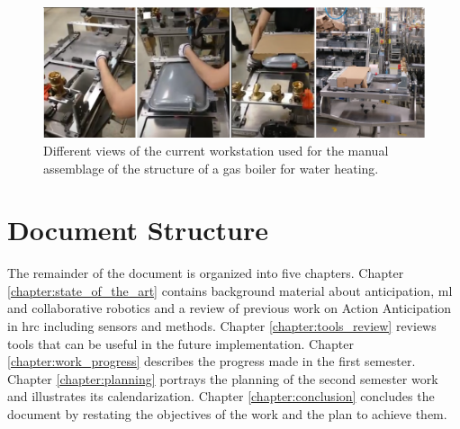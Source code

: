 \begin{figure}[H]
\centerline{\includegraphics[width=6in]{figs/usecase.png}}
\caption{Different views of the current workstation used for the manual assemblage of the structure of a gas boiler for water heating.}
\label{fig:usecase}
\end{figure}

\section{Document Structure}

The remainder of the document is organized into five chapters. Chapter \ref{chapter:state_of_the_art} contains background material about anticipation, \acl{ml} and collaborative robotics and a review of previous work on Action Anticipation in \acs{hrc} including sensors and methods. Chapter \ref{chapter:tools_review} reviews tools that can be useful in the future implementation. Chapter \ref{chapter:work_progress} describes the progress made in the first semester. Chapter \ref{chapter:planning} portrays the planning of the second semester work and illustrates its calendarization. Chapter \ref{chapter:conclusion} concludes the document by restating the objectives of the work and the plan to achieve them.
